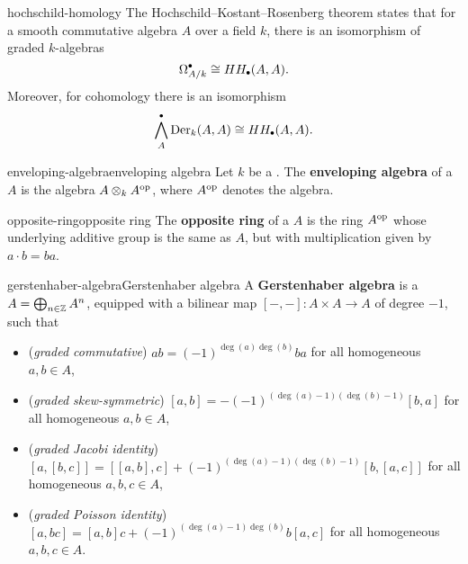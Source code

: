 \begin{example}{hochschild-homology}
    The Hochschild--Kostant--Rosenberg theorem states that for a smooth  commutative algebra $A$ over a field $k$, there is an isomorphism of graded $k$-algebras
    \[ \Omega^\bdot_{A/k} \isom HH_\bdot(A, A) . \]
    Moreover, for cohomology there is an isomorphism
    \[ \bigwedge^\bdot_A \textup{Der}_k(A, A) \isom HH_\bdot(A, A) . \]
\end{example}

\begin{topic}{enveloping-algebra}{enveloping algebra}
    Let $k$ be a . The \textbf{enveloping algebra} of a  $A$ is the algebra $A \otimes_k A^\textup{op}$, where $A^\textup{op}$ denotes the  algebra.
\end{topic}

\begin{topic}{opposite-ring}{opposite ring}
    The \textbf{opposite ring} of a  $A$ is the ring $A^\textup{op}$ whose underlying additive group is the same as $A$, but with multiplication given by $a \cdot b = ba$.
\end{topic}


\begin{topic}{gerstenhaber-algebra}{Gerstenhaber algebra}
    A \textbf{Gerstenhaber algebra} is a   $A = \bigoplus_{n \in \mathbb{Z}} A^n$, equipped with a bilinear map $[-, -] : A \times A \to A$ of degree $-1$, such that
    \begin{itemize}
        \item (\textit{graded commutative}) $ab = (-1)^{\deg(a) \deg(b)} ba$ for all homogeneous $a, b \in A$,
        \item (\textit{graded skew-symmetric}) $[a, b] = -(-1)^{(\deg(a) - 1)(\deg(b) - 1)} [b, a]$ for all homogeneous $a, b \in A$,
        \item (\textit{graded Jacobi identity}) $[a, [b, c]] = [[a, b], c] + (-1)^{(\deg(a) - 1)(\deg(b) - 1)} [b, [a, c]]$ for all homogeneous $a, b, c \in A$,
        \item (\textit{graded Poisson identity}) $[a, bc] = [a, b]c + (-1)^{(\deg(a) - 1) \deg(b)} b [a, c]$ for all homogeneous $a, b, c \in A$.
    \end{itemize}
\end{topic}

